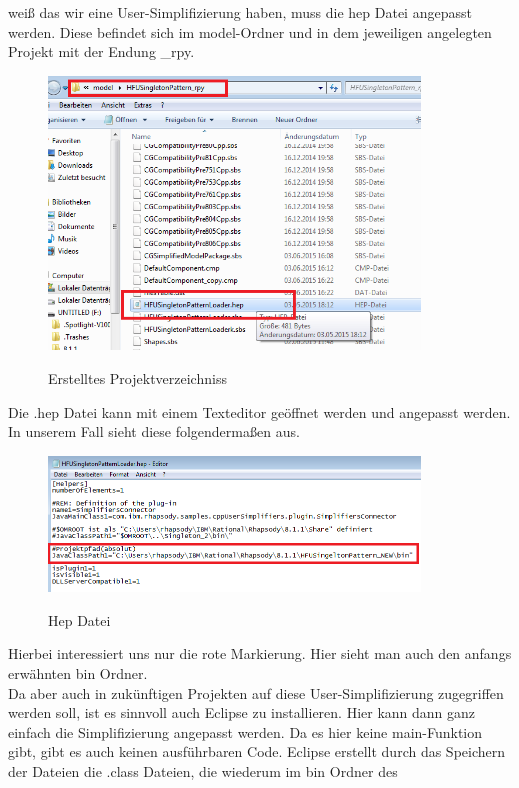 weiß das wir eine User-Simplifizierung haben, muss die hep Datei angepasst
werden. Diese befindet sich im model-Ordner und in dem jeweiligen angelegten
Projekt mit der Endung _rpy.
\begin{figure}[!htbp]
	\centering
	\includegraphics[width=0.88\textwidth]{content/pictures/install/model.png}
	\label{pic:bild}
	\caption{Erstelltes Projektverzeichniss}
\end{figure}
Die .hep Datei kann mit einem Texteditor geöffnet werden und angepasst werden.
In unserem Fall sieht diese folgendermaßen aus.
\begin{figure}[!htbp]
	\centering
	\includegraphics[width=0.88\textwidth]{content/pictures/install/hep.png}
	\label{pic:bild}
	\caption{Hep Datei}
\end{figure}
Hierbei interessiert uns nur die rote Markierung. Hier sieht man auch den
anfangs erwähnten bin Ordner.\\
Da aber auch in zukünftigen Projekten auf diese User-Simplifizierung zugegriffen
werden soll, ist es sinnvoll auch Eclipse zu installieren. Hier kann dann ganz
einfach die Simplifizierung angepasst werden. Da es hier keine main-Funktion
gibt, gibt es auch keinen ausführbaren Code. Eclipse erstellt durch das
Speichern der Dateien die .class Dateien, die wiederum im bin Ordner des
